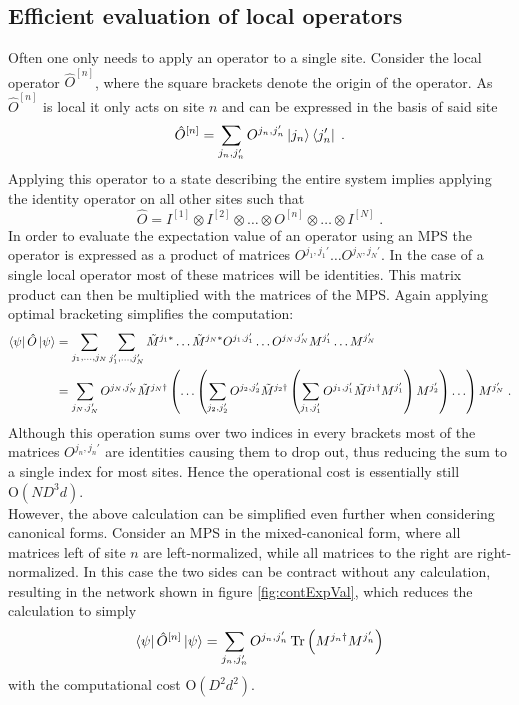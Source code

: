 \subsection{Efficient evaluation of local operators}
Often one only needs to apply an operator to a single site. Consider the local operator $\hat{O}^{[n]}$, where the square brackets denote the origin of the operator. As $\hat{O}^{[n]}$ is local it only acts on site $n$ and can be expressed in the basis of said site
\begin{equation}
	\hat{O}^{[n]} = \sum_{j_n , j_n '} O^{j_n , j_n '} \ket{j_n} \bra{j_n '} \; .
	\label{eq:localOperator}
\end{equation}
Applying this operator to a state describing the entire system implies applying the identity operator on all other sites such that
\begin{equation}
	\hat{O} = I^{[1]} \otimes I^{[2]} \otimes \ldots \otimes O^{[n]} \otimes \ldots \otimes I^{[N]} \; .
	\label{eq:localOps}
\end{equation}
In order to evaluate the expectation value of an operator using an MPS the operator is expressed as a product of matrices $O^{j_1 , j_1 '} \ldots O^{j_N , j_N '}$. In the case of a single local operator most of these matrices will be identities. This matrix product can then be multiplied with the matrices of the MPS. Again applying optimal bracketing simplifies the computation: 
\begin{align}
	\bra{\psi} \hat{O} \ket{\psi} & = \sum_{j_1 , \ldots , j_N} \sum_{j_1 ' , \ldots , j_N '} \tilde{M}^{j_1 *} \ldots \tilde{M}^{j_N *} O^{j_1 , j_1 '} \ldots O^{j_N , j_N '} M^{j_1 '} \ldots M^{j_N '} \\
	& = \sum_{j_N , j_N '} O^{j_N , j_N '}  \tilde{M}^{j_N \dag} \left( \ldots \left( \sum_{j_2 , j_2 '} O^{j_2 , j_2 '} \tilde{M}^{j_2 \dag} \left( \sum_{j_1 , j_1 '} O^{j_1 , j_1 '} \tilde{M}^{j_1 \dag} M^{j_1 '} \right) M^{j_2 '} \right) \ldots \right) M^{j_N '} \; .
	\label{eq:optBracketsOPS}
\end{align} 
Although this operation sums over two indices in every brackets most of the matrices $O^{j_n , j_n '}$ are identities causing them to drop out, thus reducing the sum to a single index for most sites. Hence the operational cost is essentially still $\mathrm{O}(N D^3 d)$.\cite{Schollwock} \\
However, the above calculation can be simplified even further when considering canonical forms. Consider an MPS in the mixed-canonical form, where all matrices left of site $n$ are left-normalized, while all matrices to the right are right-normalized. In this case the two sides can be contract without any calculation, resulting in the network shown in figure \ref{fig:contExpVal}, which reduces the calculation to simply
\begin{equation}
	\bra{\psi} \hat{O}^{[n]} \ket{\psi} = \sum_{j_n , j_n '} O^{j_n , j_n '} \Tr \left( M^{j_n \dag} M^{j_n '} \right) 
\end{equation}
with the computational cost $\mathrm{O}(D^2 d^2)$.

